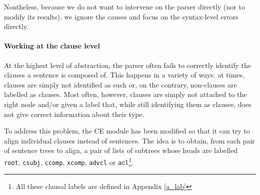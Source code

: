 Nontheless, because we do not want to intervene on the parser directly (nor to modify its results), we ignore the causes and focus on the syntax-level errors directly. \smallskip

\paragraph{Working at the clause level} \label{clauses}
At the highest level of abstraction, the parser often fails to correctly identify the clauses a sentence is composed of. 
This happens in a variety of ways: at times, clauses are simply not identified as such or, on the contrary, non-clauses are labelled as clauses. 
Most often, however, clauses are simply not attached to the right node and/or given a label that, while still identifying them as clauses, does not give correct information about their type. \smallskip

To address this problem, the CE module has been modified so that it can try to align individual clauses instead of sentences. 
The idea is to obtain, from each pair of sentence trees to align, a pair of lists of subtrees whose heads are labelled \texttt{root}, \texttt{csubj}, \texttt{ccomp}, \texttt{xcomp}, \texttt{advcl} or  \texttt{acl}\footnote{All these clausal labels are defined in Appendix \ref{a_lab}}.

